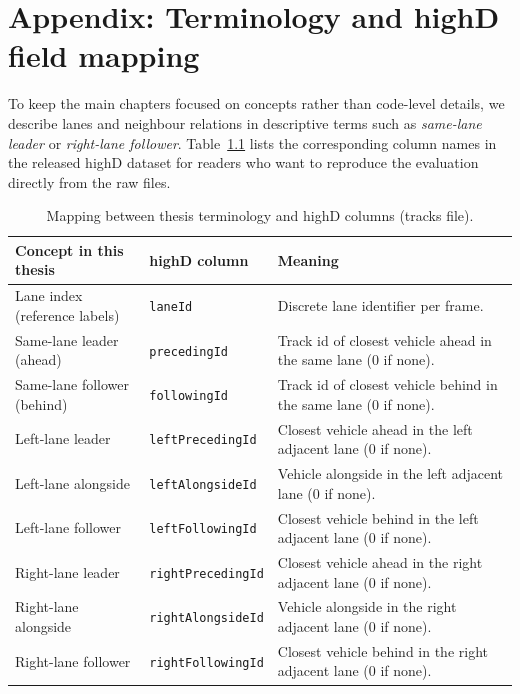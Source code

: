 \documentclass[12pt,a4paper,twoside,openright]{report}
\begin{document}
    \appendix
    \cleardoublepage

    \chapter{Appendix: Terminology and highD field mapping}
    \label{app:field-mapping}

    To keep the main chapters focused on concepts rather than code-level details, we describe lanes and neighbour relations in descriptive terms such as \emph{same-lane leader} or \emph{right-lane follower}. Table~\ref{tab:field-mapping} lists the corresponding column names in the released highD dataset for readers who want to reproduce the evaluation directly from the raw files.

    \begin{table}[H]
        \centering
        \caption{Mapping between thesis terminology and highD columns (tracks file).}
        \label{tab:field-mapping}
        {\small
        \setlength{\tabcolsep}{4pt}
            \begin{tabularx}{\textwidth}{@{}l l X@{}}
\toprule
Concept in this thesis & highD column & Meaning \\
\midrule
Lane index (reference labels) & \texttt{laneId} & Discrete lane identifier per frame. \\
Same-lane leader (ahead) & \texttt{precedingId} & Track id of closest vehicle ahead in the same lane (0 if none). \\
Same-lane follower (behind) & \texttt{followingId} & Track id of closest vehicle behind in the same lane (0 if none). \\
Left-lane leader & \texttt{leftPrecedingId} & Closest vehicle ahead in the left adjacent lane (0 if none). \\
Left-lane alongside & \texttt{leftAlongsideId} & Vehicle alongside in the left adjacent lane (0 if none). \\
Left-lane follower & \texttt{leftFollowingId} & Closest vehicle behind in the left adjacent lane (0 if none). \\
Right-lane leader & \texttt{rightPrecedingId} & Closest vehicle ahead in the right adjacent lane (0 if none). \\
Right-lane alongside & \texttt{rightAlongsideId} & Vehicle alongside in the right adjacent lane (0 if none). \\
Right-lane follower & \texttt{rightFollowingId} & Closest vehicle behind in the right adjacent lane (0 if none). \\
\bottomrule
            \end{tabularx}}
    \end{table}
\end{document}
